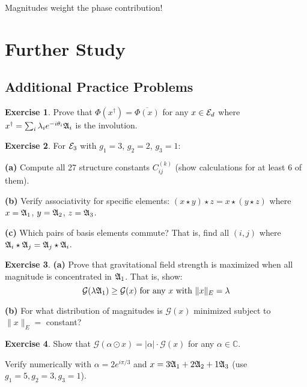 \documentclass[12pt,a4paper]{article}
\theoremstyle{definition}
\newtheorem{exercise}{Exercise}[section]
\theoremstyle{remark}
\begin{document}
Magnitudes weight the phase contribution!

\newpage
\section{Further Study}

\subsection{Additional Practice Problems}

\begin{exercise}
Prove that $\Phi(x^{\dagger}) = \overline{\Phi(x)}$ for any $x \in \mathcal{E}_{d}$ where $x^{\dagger} = \sum_i \lambda_i e^{-i\theta_i}\mathfrak{A}_{i}$ is the involution.
\end{exercise}

\begin{exercise}
For $\mathcal{E}_{3}$ with $g_1 = 3$, $g_2 = 2$, $g_3 = 1$:

\textbf{(a)} Compute all 27 structure constants $C_{ij}^{(k)}$ (show calculations for at least 6 of them).

\textbf{(b)} Verify associativity for specific elements: $(x \star y) \star z = x \star (y \star z)$ where $x = \mathfrak{A}_{1}$, $y = \mathfrak{A}_{2}$, $z = \mathfrak{A}_{3}$.

\textbf{(c)} Which pairs of basis elements commute? That is, find all $(i,j)$ where $\mathfrak{A}_{i} \star \mathfrak{A}_{j} = \mathfrak{A}_{j} \star \mathfrak{A}_{i}$.
\end{exercise}

\begin{exercise}
\textbf{(a)} Prove that gravitational field strength is maximized when all magnitude is concentrated in $\mathfrak{A}_{1}$. That is, show:
$$\mathcal{G}(\lambda \mathfrak{A}_{1}) \geq \mathcal{G}(x) \text{ for any } x \text{ with } \|x\|_E = \lambda$$

\textbf{(b)} For what distribution of magnitudes is $\mathcal{G}(x)$ minimized subject to $\|x\|_E = $ constant?
\end{exercise}

\begin{exercise}
Show that $\mathcal{G}(\alpha \odot x) = |\alpha| \cdot \mathcal{G}(x)$ for any $\alpha \in \mathbb{C}$.

Verify numerically with $\alpha = 2e^{i\pi/3}$ and $x = 3\mathfrak{A}_{1} + 2\mathfrak{A}_{2} + 1\mathfrak{A}_{3}$ (use $g_1=5, g_2=3, g_3=1$).
\end{exercise}
\end{document}
